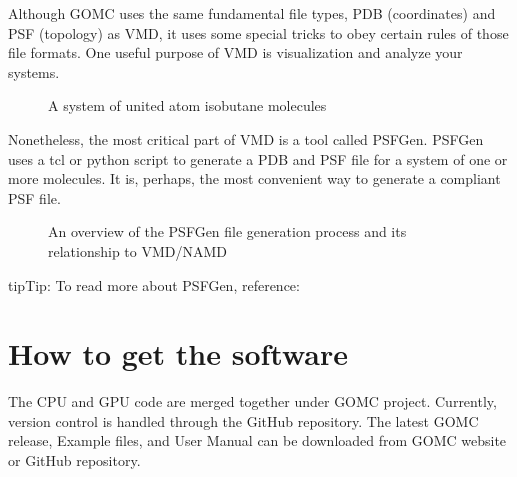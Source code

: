 \documentclass[letterpaper,10pt,english]{sphinxmanual}
\begin{document}

Although GOMC uses the same fundamental file types, PDB (coordinates) and PSF (topology) as VMD, it uses some special tricks to obey certain rules of those file formats. One useful purpose of VMD is visualization and analyze your systems.

\begin{figure}[htbp]
\centering
\capstart

\noindent{}
\caption{A system of united atom isobutane molecules}\label{\detokenize{software_tools:id1}}\end{figure}

Nonetheless, the most critical part of VMD is a tool called PSFGen. PSFGen uses a tcl or python script to generate a PDB and PSF file for a system of one or more molecules. It is, perhaps, the most convenient way to generate a compliant PSF file.

\begin{figure}[htbp]
\centering
\capstart

\noindent{}
\caption{An overview of the PSFGen file generation process and its relationship to VMD/NAMD}\label{\detokenize{software_tools:id2}}\end{figure}

\begin{sphinxadmonition}{tip}{Tip:}
To read more about PSFGen, reference:



\end{sphinxadmonition}


\chapter{How to get the software}
\label{\detokenize{download:how-to-get-the-software}}\label{\detokenize{download::doc}}
The CPU and GPU code are merged together under GOMC project. Currently, version control is handled through the GitHub repository. The latest GOMC release, Example files, and User Manual can be downloaded from GOMC website or GitHub repository.
\end{document}
